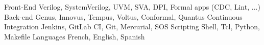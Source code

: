 

\begin{cvskills}

  \cvskill
    {Front-End} %
    {Verilog, SystemVerilog, UVM, SVA, DPI, Formal apps (CDC, Lint, ...)} %
  \cvskill
    {Back-end} %
    {Genus, Innovus, Tempus, Voltus, Conformal, Quantus} %
  \cvskill
    {Continuous Integration} %
    {Jenkins, GitLab CI, Git, Mercurial, SOS} %
  \cvskill
    {Scripting} %
    {Shell, Tcl, Python, Makefile} %
  \cvskill
    {Languages} %
    {French, English, Spanish} %

\end{cvskills}
